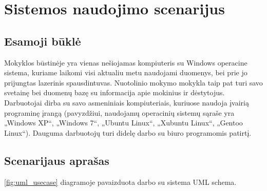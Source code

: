 \chapter{Sistemos naudojimo scenarijus}

\section{Esamoji būklė}

Mokyklos būstinėje yra vienas nešiojamas kompiuteris su Windows operacine
sistema, kuriame laikomi visi aktualiu metu naudojami duomenys, bei 
prie jo prijungtas 
lazerinis spausdintuvas. Nuotolinio mokymo mokykla taip pat turi savo 
svetainę bei duomenų bazę su informacija apie mokinius ir dėstytojus.
Darbuotojai dirba su savo asmeniniais kompiuteriais, kuriuose naudoja
įvairią programinę įrangą (pavyzdžiui, naudojamų operacinių sistemų 
sąraše yra „Windows XP“, „Windows 7“, „Ubuntu Linux“, „Xubuntu Linux“,
„Gentoo Linux“). Dauguma darbuotojų turi didelę darbo su biuro 
programomis patirtį.

\section{Scenarijaus aprašas}

\ref{fig:uml_usecase} diagramoje pavaizduota darbo su sistema UML schema.
\hfill \\

